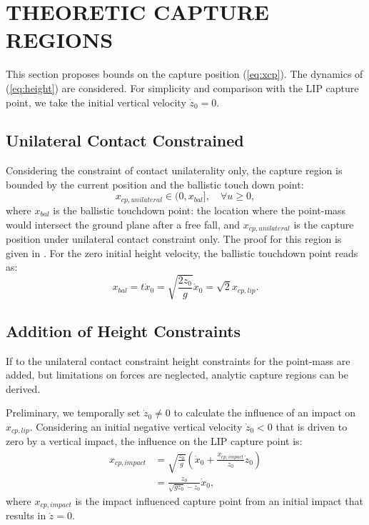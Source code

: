 \documentclass[letterpaper, 10 pt, conference]{ieeeconf}  %
\begin{document}
\section{THEORETIC CAPTURE REGIONS}\label{sec:regions}
This section proposes bounds on the capture position (\ref{eq:xcp}). The dynamics of (\ref{eq:height}) are considered. For simplicity and comparison with the LIP capture point, we take the initial vertical velocity $\dot{z}_0=0$.
\subsection{Unilateral Contact Constrained}
 Considering the constraint of contact unilaterality only, the capture region is bounded by the current position and the ballistic touch down point:
\begin{equation}
	x_{cp,unilateral} \in (0, x_{bal}], \quad \forall u \geq 0, 
	\label{eq:xcpuni}
\end{equation}
where $x_{bal}$ is the ballistic touchdown point: the location where the point-mass would intersect the ground plane after a free fall, and $x_{cp,unilateral}$ is the capture position under unilateral contact constraint only. The proof for this region is given in \cite{koolen2016balance}. For the zero initial height velocity, the ballistic touchdown point reads as:
\begin{equation}
 x_{bal}=t \dot{x}_0=\sqrt{\frac{2z_0}{g}}\dot{x}_0=\sqrt{2}x_{cp,lip}.
 	\label{eq:xbal}
\end{equation}

\subsection{Addition of Height Constraints}
If to the unilateral contact constraint height constraints for the point-mass are added, but limitations on forces are neglected, analytic capture regions can be derived. 

Preliminary, we temporally set $\dot{z}_0 \neq 0$ to calculate the influence of an impact on $x_{cp,lip}$. Considering an initial negative vertical velocity $\dot{z}_0<0$ that is driven to zero by a vertical impact, the influence on the LIP capture point is:
\begin{align}
	x_{cp,impact} &= \sqrt{\frac{z_0}{g}}(\dot{x}_0 + \frac{x_{cp,impact}}{z_0}\dot{z}_0)\\
	&=\frac{z_0}{\sqrt{gz_0}-\dot{z}_0}\dot{x}_0, \label{eq:xcpimpact}
\end{align}
where $x_{cp,impact}$ is the impact influenced capture point from an initial impact that results in $\dot{z}=0$.
\end{document}
